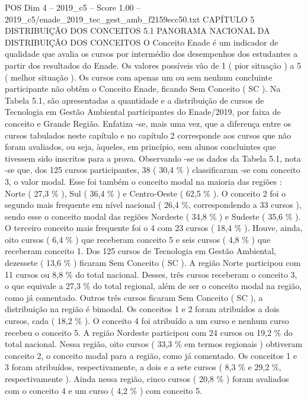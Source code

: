 \begin{textsample}{POS Dim 4 – 2019\_c5 – Score 1.00 – 2019\_c5/enade\_2019\_tec\_gest\_amb\_f2159ecc50.txt}  \label{ex:f4_pos_195}
CAPÍTULO 5 DISTRIBUIÇÃO DOS CONCEITOS 5.1 PANORAMA NACIONAL DA DISTRIBUIÇÃO DOS CONCEITOS O Conceito Enade é um indicador de qualidade que avalia os cursos por intermédio dos desempenhos dos estudantes a partir dos resultados do Enade.
Os valores possíveis vão de 1 ( pior situação ) a 5 ( melhor situação ).
Os cursos com apenas um ou sem nenhum concluinte participante não obtêm o Conceito Enade, ficando Sem Conceito ( SC ).
Na Tabela 5.1, são apresentadas a quantidade e a distribuição de cursos de Tecnologia em Gestão Ambiental participantes do Enade/2019, por faixa de conceito e Grande Região.
Enfatiza -se, mais uma vez, que a diferença entre os cursos tabulados neste capítulo e no capítulo 2 corresponde aos cursos que não foram avaliados, ou seja, àqueles, em princípio, sem alunos concluintes que tivessem sido inscritos para a prova.
Observando -se os dados da Tabela 5.1, nota -se que, dos 125 cursos participantes, 38 ( 30,4 \% ) classificaram -se com conceito 3, o valor modal.
Esse foi também o conceito modal na maioria das regiões : Norte ( 27,3 \% ), Sul ( 36,4 \% ) e Centro-Oeste ( 62,5 \% ).
O conceito 2 foi o segundo mais frequente em nível nacional ( 26,4 \%, correspondendo a 33 cursos ), sendo esse o conceito modal das regiões Nordeste ( 34,8 \% ) e Sudeste ( 35,6 \% ).
O terceiro conceito mais frequente foi o 4 com 23 cursos ( 18,4 \% ).
Houve, ainda, oito cursos ( 6,4 \% ) que receberam conceito 5 e seis cursos ( 4,8 \% ) que receberam conceito 1.
Dos 125 cursos de Tecnologia em Gestão Ambiental, dezessete ( 13,6 \% ) ficaram Sem Conceito ( SC ).
A região Norte participou com 11 cursos ou 8,8 \% do total nacional.
Desses, três cursos receberam o conceito 3, o que equivale a 27,3 \% do total regional, além de ser o conceito modal na região, como já comentado.
Outros três cursos ficaram Sem Conceito ( SC ), a distribuição na região é bimodal.
Os conceitos 1 e 2 foram atribuídos a dois cursos, cada ( 18,2 \% ).
O conceito 4 foi atribuído a um curso e nenhum curso recebeu o conceito 5.
A região Nordeste participou com 24 cursos ou 19,2 \% do total nacional.
Nessa região, oito cursos ( 33,3 \% em termos regionais ) obtiveram conceito 2, o conceito modal para a região, como já comentado.
Os conceitos 1 e 3 foram atribuídos, respectivamente, a dois e a sete cursos ( 8,3 \% e 29,2 \%, respectivamente ).
Ainda nessa região, cinco cursos ( 20,8 \% ) foram avaliados com o conceito 4 e um curso ( 4,2 \% ) com conceito 5.

\end{textsample}
